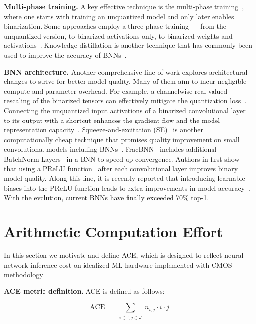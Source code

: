 \textbf{Multi-phase training.} A key effective technique is the multi-phase training~\cite{Bulat2019pose, Martinez2020realtobinary, Liu2020reactnet, liu2021adambnn}, where one starts with training an unquantized model and only later enables binarization. Some approaches employ a three-phase training — from the unquantized version, to binarized activations only, to binarized weights and activations~\cite{Martinez2020realtobinary}. Knowledge distillation is another technique that has commonly been used to improve the accuracy of BNNs~\cite{Bulat2019pose, Martinez2020realtobinary, Liu2020reactnet, liu2021adambnn}.

\textbf{BNN architecture.} Another comprehensive line of work explores architectural changes to strive for better model quality. Many of them aim to incur negligible compute and parameter overhead. For example, a channelwise real-valued rescaling of the binarized tensors can effectively mitigate the quantization loss~\cite{rastegari2016xnornet, bulat2019xnornetplus, akhauri2019hadanets}. Connecting the unquantized input activations of a binarized convolutional layer to its output with a shortcut enhances the gradient flow and the model representation capacity~\cite{Liu2018bireal}. Squeeze-and-excitation (SE)~\cite{hu2018se} is another computationally cheap technique that promises quality improvement on small convolutional models including BNNs~\cite{Martinez2020realtobinary}. FracBNN~\cite{zhang2021fracbnn} includes additional BatchNorm Layers~\cite{ioffe2015batchnorm} in a BNN to speed up convergence. Authors in \cite{Bulat2019pose} first show that using a PReLU function~\cite{He2015rectifiers} after each convolutional layer improves binary model quality. Along this line, it is recently reported that introducing learnable biases into the PReLU function leads to extra improvements in model accuracy~\cite{Liu2020reactnet, liu2021adambnn}. With the evolution, current BNNs have finally exceeded 70\% top-1. 

\section{Arithmetic Computation Effort}
\label{sec:ace}

In this section we motivate and define ACE, which is designed to reflect neural network inference cost on idealized ML hardware implemented with CMOS methodology.

\textbf{ACE metric definition.} ACE is defined as follows:

\begin{equation}
\operatorname{ACE} = \sum_{\substack{i \in I, j \in J}} n_{i, j} \cdot i \cdot j \end{equation}

